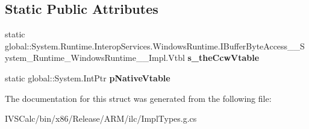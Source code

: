 \subsection*{Static Public Attributes}
\begin{DoxyCompactItemize}
\item 
\mbox{\label{struct_system_1_1_runtime_1_1_interop_services_1_1_windows_runtime_1_1_i_buffer_byte_access_____6d4d383a825dd9054acf9d9a911f036f_a241cd7e30241a6c477c871e510b769a2}} 
static global\+::\+System.\+Runtime.\+Interop\+Services.\+Windows\+Runtime.\+I\+Buffer\+Byte\+Access\+\_\+\+\_\+\+System\+\_\+\+Runtime\+\_\+\+Windows\+Runtime\+\_\+\+\_\+\+Impl.\+Vtbl {\bfseries s\+\_\+the\+Ccw\+Vtable}
\item 
\mbox{\label{struct_system_1_1_runtime_1_1_interop_services_1_1_windows_runtime_1_1_i_buffer_byte_access_____6d4d383a825dd9054acf9d9a911f036f_a8b4299e130c153693d13e193e170cf32}} 
static global\+::\+System.\+Int\+Ptr {\bfseries p\+Native\+Vtable}
\end{DoxyCompactItemize}


The documentation for this struct was generated from the following file\+:\begin{DoxyCompactItemize}
\item 
I\+V\+S\+Calc/bin/x86/\+Release/\+A\+R\+M/ilc/Impl\+Types.\+g.\+cs\end{DoxyCompactItemize}
